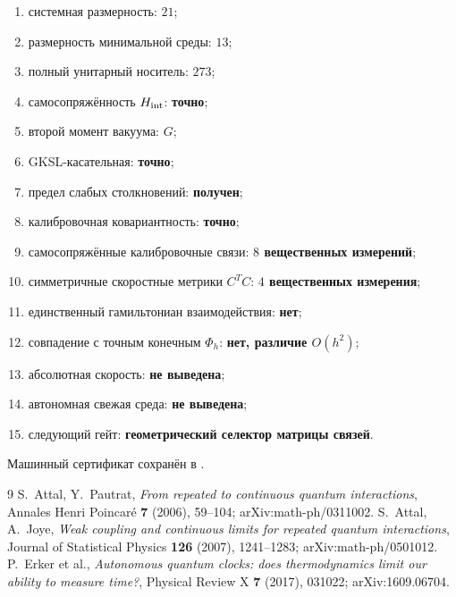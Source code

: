 \begin{protocol}
\begin{enumerate}
 \item системная размерность: \textbf{$21$};
 \item размерность минимальной среды: \textbf{$13$};
 \item полный унитарный носитель: \textbf{$273$};
 \item самосопряжённость $H_{\rm int}$: \textbf{точно};
 \item второй момент вакуума: \textbf{$G$};
 \item GKSL-касательная: \textbf{точно};
 \item предел слабых столкновений: \textbf{получен};
 \item калибровочная ковариантность: \textbf{точно};
 \item самосопряжённые калибровочные связи: \textbf{$8$ вещественных измерений};
 \item симметричные скоростные метрики $C^TC$: \textbf{$4$ вещественных измерения};
 \item единственный гамильтониан взаимодействия: \textbf{нет};
 \item совпадение с точным конечным $\Phi_h$: \textbf{нет, различие $O(h^2)$};
 \item абсолютная скорость: \textbf{не выведена};
 \item автономная свежая среда: \textbf{не выведена};
 \item следующий гейт: \textbf{геометрический селектор матрицы связей}.
\end{enumerate}
\end{protocol}

Машинный сертификат сохранён в
.

\begin{thebibliography}{9}
S.~Attal, Y.~Pautrat,
\emph{From repeated to continuous quantum interactions},
Annales Henri Poincar\'e \textbf{7} (2006), 59--104;
arXiv:math-ph/0311002.
S.~Attal, A.~Joye,
\emph{Weak coupling and continuous limits for repeated quantum interactions},
Journal of Statistical Physics \textbf{126} (2007), 1241--1283;
arXiv:math-ph/0501012.
P.~Erker et al.,
\emph{Autonomous quantum clocks: does thermodynamics limit our ability to
measure time?}, Physical Review X \textbf{7} (2017), 031022;
arXiv:1609.06704.
\end{thebibliography}